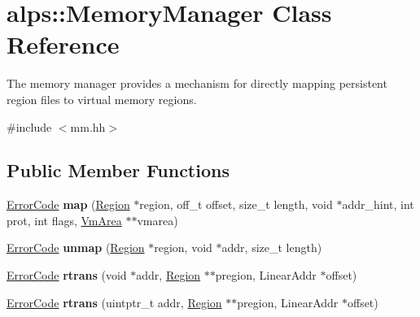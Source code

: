 \hypertarget{classalps_1_1MemoryManager}{}\section{alps\+:\+:Memory\+Manager Class Reference}
\label{classalps_1_1MemoryManager}


The memory manager provides a mechanism for directly mapping persistent region files to virtual memory regions.  




{\ttfamily \#include $<$mm.\+hh$>$}

\subsection*{Public Member Functions}
\begin{DoxyCompactItemize}
\item 
\hyperlink{group__ERRORCODES_ga6263a3c9a0b8d36aea21cdd835ac99fe}{Error\+Code} {\bfseries map} (\hyperlink{classalps_1_1Region}{Region} $\ast$region, off\+\_\+t offset, size\+\_\+t length, void $\ast$addr\+\_\+hint, int prot, int flags, \hyperlink{classalps_1_1VmArea}{Vm\+Area} $\ast$$\ast$vmarea)\hypertarget{classalps_1_1MemoryManager_a0795e8c13ff24a1fd717fac961f9c797}{}\label{classalps_1_1MemoryManager_a0795e8c13ff24a1fd717fac961f9c797}

\item 
\hyperlink{group__ERRORCODES_ga6263a3c9a0b8d36aea21cdd835ac99fe}{Error\+Code} {\bfseries unmap} (\hyperlink{classalps_1_1Region}{Region} $\ast$region, void $\ast$addr, size\+\_\+t length)\hypertarget{classalps_1_1MemoryManager_a7f9e8c4d40c4a2a6417de4fad89f8d46}{}\label{classalps_1_1MemoryManager_a7f9e8c4d40c4a2a6417de4fad89f8d46}

\item 
\hyperlink{group__ERRORCODES_ga6263a3c9a0b8d36aea21cdd835ac99fe}{Error\+Code} {\bfseries rtrans} (void $\ast$addr, \hyperlink{classalps_1_1Region}{Region} $\ast$$\ast$pregion, Linear\+Addr $\ast$offset)\hypertarget{classalps_1_1MemoryManager_ad436265484fce31b03e714f031f28403}{}\label{classalps_1_1MemoryManager_ad436265484fce31b03e714f031f28403}

\item 
\hyperlink{group__ERRORCODES_ga6263a3c9a0b8d36aea21cdd835ac99fe}{Error\+Code} {\bfseries rtrans} (uintptr\+\_\+t addr, \hyperlink{classalps_1_1Region}{Region} $\ast$$\ast$pregion, Linear\+Addr $\ast$offset)\hypertarget{classalps_1_1MemoryManager_a5f27ecadfe7b172003cdecca423ee56c}{}\label{classalps_1_1MemoryManager_a5f27ecadfe7b172003cdecca423ee56c}

\end{DoxyCompactItemize}


